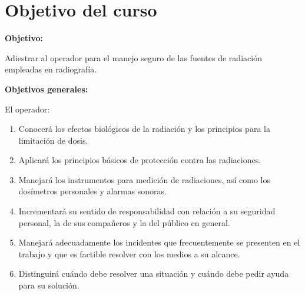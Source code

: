 \chapter*{Objetivo del curso}

\textbf{Objetivo:}

Adiestrar al operador para el manejo seguro de las fuentes de radiación empleadas en radiografía.

\textbf{Objetivos generales:}

El operador:
\begin{enumerate}
  \item Conocerá los efectos biológicos de la radiación y los principios para la limitación de dosis.
  \item Aplicará los principios básicos de protección contra las radiaciones.
  \item Manejará los instrumentos para medición de radiaciones, así como los dosímetros personales y alarmas sonoras.
  \item Incrementará su sentido de responsabilidad con relación a su seguridad personal, la de sus compañeros y la del público en general.
  \item Manejará adecuadamente los incidentes que frecuentemente se presenten en el trabajo y que es factible resolver con los medios a su alcance.
  \item Distinguirá cuándo debe resolver una situación y cuándo debe pedir ayuda para su solución.
\end{enumerate}
